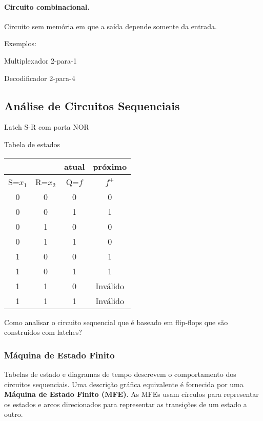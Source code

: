 \paragraph{Circuito combinacional.} Circuito sem memória em que a
saída depende somente da entrada.

\myfigure


\noindent Exemplos:

\noindent Multiplexador 2-para-1

\myfigure

\noindent Decodificador 2-para-4


\myfigure


\subsection*{Análise de Circuitos Sequenciais}


\noindent Latch S-R com porta NOR

\myfigure

\noindent Tabela de estados

\begin{center}
\begin{tabular}[ht]{cccc}\hline
  & & atual & próximo \\\hline
  S=$x_1$ & R=$x_2$ & Q=$f$ & $f^+$\\\hline
  0& 0 & 0 & 0\\
  0& 0 & 1 & 1\\
  0& 1 & 0 & 0\\
  0& 1 & 1 & 0\\
  1& 0 & 0 & 1\\
  1& 0 & 1 & 1\\
  1& 1 & 0 & Inválido\\  
  1& 1 & 1 & Inválido\\
\end{tabular}
\end{center}

Como analisar o circuito sequencial que é baseado em flip-flops que
são construídos com latches?


\myfigure

\subsubsection{Máquina de Estado Finito}

Tabelas de estado e diagramas de tempo descrevem o comportamento dos
circuitos sequenciais. Uma descrição gráfica equivalente é fornecida
por uma {\bf Máquina de Estado Finito (MFE)}. As MFEs usam círculos
para representar os estados e arcos direcionados para representar as
transições de um estado a outro.

